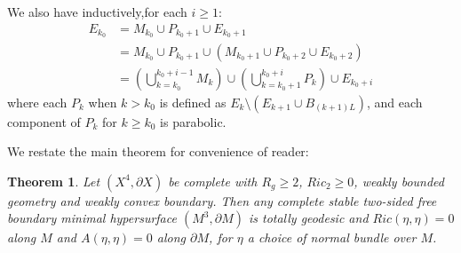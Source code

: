 \documentclass[12pt]{amsart}
\newcommand{\p}{\partial}
\newtheorem{theorem}{Theorem}[section]
\numberwithin{equation}{section}
\begin{document}
	We also have inductively,for each $i\geq 1$:
	\begin{align*}
		E_{k_0}&=M_{k_0} \cup P_{k_0+1} \cup E_{k_0+1}\\
		&=M_{k_0} \cup P_{k_0+1} \cup (M_{k_0+1} \cup P_{k_0+2}  \cup E_{k_0+2})\\
		&=\left(\bigcup \limits_{k=k_0}^{k_0+i-1} M_k \right)\cup \left(\bigcup \limits_{k=k_0+1}^{k_0+i} P_k\right) \cup E_{k_0+i}
	\end{align*}
	where each $P_k$ when $k > k_0$ is defined as $E_{k} \setminus (E_{k+1} \cup B_{(k+1)L})$, and each component of $P_k$ for $k \geq k_0$ is parabolic.

	We restate the main theorem for convenience of reader:

	\begin{theorem}\label{ThmMain}
		Let $(X^4, \partial X)$ be complete  with $R_g \geq 2$, $Ric_2 \geq 0$, weakly bounded geometry and weakly convex boundary. Then any complete stable two-sided free boundary minimal hypersurface $(M^3,\partial M)$ is totally geodesic and $Ric(\eta,\eta)=0$ along $M$ and $A(\eta,\eta)=0$ along $\p M$, for $\eta$ a choice of normal bundle over $M$.
	\end{theorem}
\end{document}
